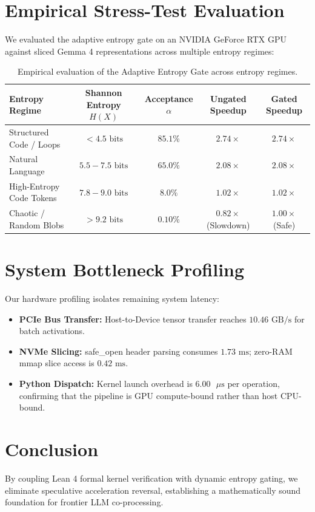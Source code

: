 \documentclass[11pt,a4paper]{article}
\begin{document}
\section{Empirical Stress-Test Evaluation}
We evaluated the adaptive entropy gate on an NVIDIA GeForce RTX GPU against sliced Gemma 4 representations across multiple entropy regimes:
\begin{table}[h]
\centering
\begin{tabular}{lcccc}
\toprule
\textbf{Entropy Regime} & \textbf{Shannon Entropy $H(X)$} & \textbf{Acceptance $\alpha$} & \textbf{Ungated Speedup} & \textbf{Gated Speedup} \\
\midrule
Structured Code / Loops  & $< 4.5\text{ bits}$  & $85.1\%$ & $2.74\times$ & $\mathbf{2.74\times}$ \\
Natural Language         & $5.5 - 7.5\text{ bits}$ & $65.0\%$ & $2.08\times$ & $\mathbf{2.08\times}$ \\
High-Entropy Code Tokens & $7.8 - 9.0\text{ bits}$ & $8.0\%$  & $1.02\times$ & $\mathbf{1.02\times}$ \\
Chaotic / Random Blobs   & $> 9.2\text{ bits}$  & $0.10\%$ & $0.82\times$ (Slowdown) & $\mathbf{1.00\times}$ (Safe) \\
\bottomrule
\end{tabular}
\caption{Empirical evaluation of the Adaptive Entropy Gate across entropy regimes.}
\end{table}

\section{System Bottleneck Profiling}
Our hardware profiling isolates remaining system latency:
\begin{itemize}
    \item \textbf{PCIe Bus Transfer:} Host-to-Device tensor transfer reaches $10.46\text{ GB/s}$ for batch activations.
    \item \textbf{NVMe Slicing:} safe\_open header parsing consumes $1.73\text{ ms}$; zero-RAM mmap slice access is $0.42\text{ ms}$.
    \item \textbf{Python Dispatch:} Kernel launch overhead is $6.00\text{ }\mu\text{s}$ per operation, confirming that the pipeline is GPU compute-bound rather than host CPU-bound.
\end{itemize}

\section{Conclusion}
By coupling Lean 4 formal kernel verification with dynamic entropy gating, we eliminate speculative acceleration reversal, establishing a mathematically sound foundation for frontier LLM co-processing.
\end{document}
